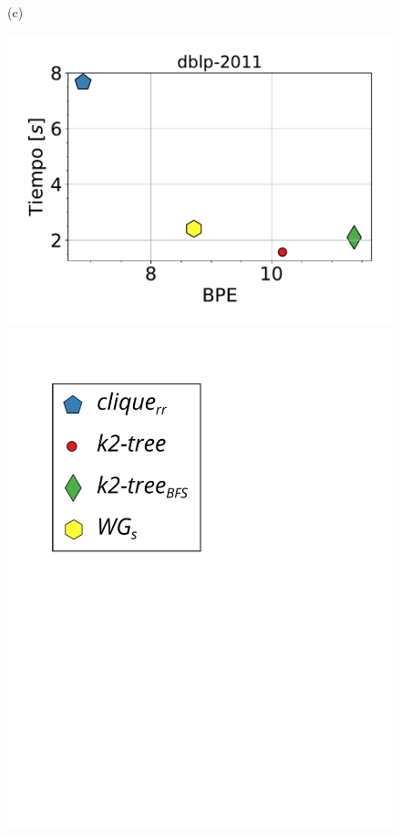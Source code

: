 \begin{figure}
\begin{minipage}{1\textwidth}
\begin{minipage}{0.45\textwidth}
    			(c)
    		\end{minipage}
    		\begin{minipage}{0.45\textwidth}
    			\centering
    			\begin{minipage}{0.75\textwidth}
    				\centering
    				\includegraphics[width=1\linewidth]{img/bpeTimes/secuencial/dblp-2011.pdf}
    			\end{minipage}
    			\begin{minipage}{0.2\textwidth}
    				\centering
    				\includegraphics[scale=.2, clip, trim=60 194 0 0]{img/bpeTimes/labelSec.pdf}
    			\end{minipage}
    			

\end{minipage}
\end{minipage}
\end{figure}
